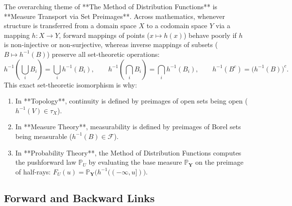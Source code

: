 \documentclass[11pt, letterpaper]{article}
\theoremstyle{definition}
\theoremstyle{remark}
\newcommand{\Prob}{\mathbb{P}}
\newcommand{\F}{\mathcal{F}}
\begin{document}
The overarching theme of **The Method of Distribution Functions** is **Measure Transport via Set Preimages**. Across mathematics, whenever structure is transferred from a domain space $X$ to a codomain space $Y$ via a mapping $h : X \to Y$, forward mappings of points ($x \mapsto h(x)$) behave poorly if $h$ is non-injective or non-surjective, whereas inverse mappings of subsets ($B \mapsto h^{-1}(B)$) preserve all set-theoretic operations:
\[
    h^{-1}\left(\bigcup_{i} B_i\right) = \bigcup_{i} h^{-1}(B_i), \qquad h^{-1}\left(\bigcap_{i} B_i\right) = \bigcap_{i} h^{-1}(B_i), \qquad h^{-1}(B^c) = \big(h^{-1}(B)\big)^c.
\]
This exact set-theoretic isomorphism is why:
\begin{enumerate}
    \item In **Topology**, continuity is defined by preimages of open sets being open ($h^{-1}(V) \in \tau_X$).
    \item In **Measure Theory**, measurability is defined by preimages of Borel sets being measurable ($h^{-1}(B) \in \F$).
    \item In **Probability Theory**, the Method of Distribution Functions computes the pushforward law $\Prob_U$ by evaluating the base measure $\Prob_{\mathbf{Y}}$ on the preimage of half-rays: $F_U(u) = \Prob_{\mathbf{Y}}\big(h^{-1}((-\infty, u])\big)$.
\end{enumerate}

\subsection{Forward and Backward Links}
\end{document}
